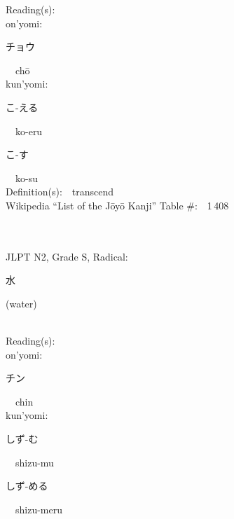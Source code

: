 \begin{multicols}{2}
Reading(s):\ \ \\
{\hspace*{1em}}on'yomi:\ \ \\
{\hspace*{2em}}{\begin{CJK}{UTF8}{min} チョウ \end{CJK}}\ \ ch\=o\ \ \\
{\hspace*{1em}}kun'yomi:\ \ \\
{\hspace*{2em}}{\begin{CJK}{UTF8}{min} こ-える \end{CJK}}\ \ ko-eru\ \ \\
{\hspace*{2em}}{\begin{CJK}{UTF8}{min} こ-す \end{CJK}}\ \ ko-su\ \ \\
Definition(s):\ \ transcend \\
Wikipedia ``List of the J\=oy\=o Kanji'' Table \#:\ \ 1\,408 \\
\ \ \\
{\fontsize{34pt}{40pt}  }\ \ \\  %
{JLPT N2, Grade S, Radical:\ \ {\begin{CJK}{UTF8}{min} 水 \end{CJK}} (water) } \\
Reading(s):\ \ \\
{\hspace*{1em}}on'yomi:\ \ \\
{\hspace*{2em}}{\begin{CJK}{UTF8}{min} チン \end{CJK}}\ \ chin\ \ \\
{\hspace*{1em}}kun'yomi:\ \ \\
{\hspace*{2em}}{\begin{CJK}{UTF8}{min} しず-む \end{CJK}}\ \ shizu-mu\ \ \\
{\hspace*{2em}}{\begin{CJK}{UTF8}{min} しず-める \end{CJK}}\ \ shizu-meru\ \ \\

\end{multicols}
